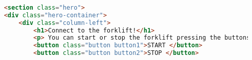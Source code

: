 \documentclass[../report.tex]{subfiles}
\begin{document}
\begin{lstlisting}[language=html,caption={The buttons' Code},label={code:webpage}]
    
    <section class="hero">
    <div class="hero-container">
        <div class="column-left">
            <h1>Connect to the forklift!</h1>
            <p> You can start or stop the forklift pressing the buttons:</p>
            <button class="button button1">START </button>
            <button class="button button2">STOP </button>

   

\end{lstlisting}
\end{document}

